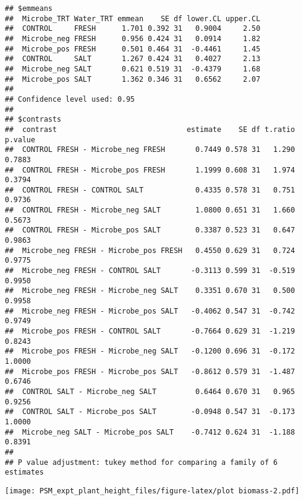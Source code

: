 \documentclass[
]{article}
\begin{document}
\begin{verbatim}
## $emmeans
##  Microbe_TRT Water_TRT emmean    SE df lower.CL upper.CL
##  CONTROL     FRESH      1.701 0.392 31   0.9004     2.50
##  Microbe_neg FRESH      0.956 0.424 31   0.0914     1.82
##  Microbe_pos FRESH      0.501 0.464 31  -0.4461     1.45
##  CONTROL     SALT       1.267 0.424 31   0.4027     2.13
##  Microbe_neg SALT       0.621 0.519 31  -0.4379     1.68
##  Microbe_pos SALT       1.362 0.346 31   0.6562     2.07
## 
## Confidence level used: 0.95 
## 
## $contrasts
##  contrast                              estimate    SE df t.ratio p.value
##  CONTROL FRESH - Microbe_neg FRESH       0.7449 0.578 31   1.290  0.7883
##  CONTROL FRESH - Microbe_pos FRESH       1.1999 0.608 31   1.974  0.3794
##  CONTROL FRESH - CONTROL SALT            0.4335 0.578 31   0.751  0.9736
##  CONTROL FRESH - Microbe_neg SALT        1.0800 0.651 31   1.660  0.5673
##  CONTROL FRESH - Microbe_pos SALT        0.3387 0.523 31   0.647  0.9863
##  Microbe_neg FRESH - Microbe_pos FRESH   0.4550 0.629 31   0.724  0.9775
##  Microbe_neg FRESH - CONTROL SALT       -0.3113 0.599 31  -0.519  0.9950
##  Microbe_neg FRESH - Microbe_neg SALT    0.3351 0.670 31   0.500  0.9958
##  Microbe_neg FRESH - Microbe_pos SALT   -0.4062 0.547 31  -0.742  0.9749
##  Microbe_pos FRESH - CONTROL SALT       -0.7664 0.629 31  -1.219  0.8243
##  Microbe_pos FRESH - Microbe_neg SALT   -0.1200 0.696 31  -0.172  1.0000
##  Microbe_pos FRESH - Microbe_pos SALT   -0.8612 0.579 31  -1.487  0.6746
##  CONTROL SALT - Microbe_neg SALT         0.6464 0.670 31   0.965  0.9256
##  CONTROL SALT - Microbe_pos SALT        -0.0948 0.547 31  -0.173  1.0000
##  Microbe_neg SALT - Microbe_pos SALT    -0.7412 0.624 31  -1.188  0.8391
## 
## P value adjustment: tukey method for comparing a family of 6 estimates
\end{verbatim}

\texttt{[image: PSM\_expt\_plant\_height\_files/figure-latex/plot biomass-2.pdf]}
\end{document}
